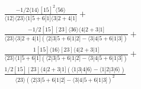 \documentclass[varwidth, border=5pt]{standalone}
\begin{document}
\begin{my}
$\begin{gathered}
\scriptscriptstyle\frac{-1/2⟨14⟩[15]^2⟨56⟩}{⟨12⟩⟨23⟩⟨1|5+6|1]⟨3|2+4|1]}+\\
\scriptscriptstyle\frac{-1/2[15][23]⟨36⟩⟨4|2+3|1]}{⟨23⟩⟨3|2+4|1](⟨2|3|5+6|1|2]-⟨3|4|5+6|1|3])}+\\
\scriptscriptstyle\frac{1[15]⟨16⟩[23]⟨4|2+3|1]}{⟨23⟩⟨1|5+6|1](⟨2|3|5+6|1|2]-⟨3|4|5+6|1|3])}+\\
\scriptscriptstyle\frac{1/2[15][23]⟨4|2+3|1](⟨1|3|4|6⟩-⟨1|2|3|6⟩)}{⟨23⟩(⟨2|3|5+6|1|2]-⟨3|4|5+6|1|3])^2}\phantom{+}
\end{gathered}$
\end{my}
\end{document}
